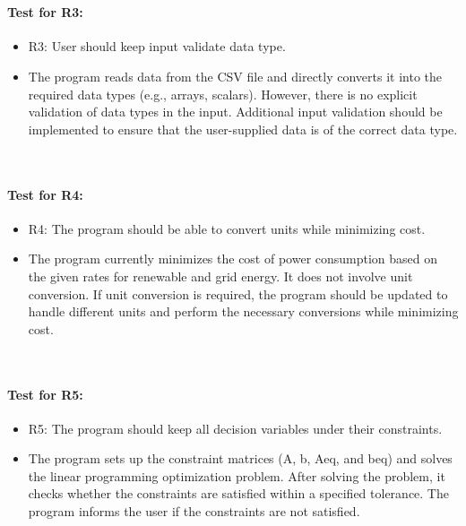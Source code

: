\documentclass[12pt, titlepage]{article}
\begin{document}
\\
\paragraph{Test for R3:}

\begin{itemize}
    \item R3: User should keep input validate data type.
    \item The program reads data from the CSV file and directly converts it into the required data types (e.g., arrays, scalars). However, there is no explicit validation of data types in the input. Additional input validation should be implemented to ensure that the user-supplied data is of the correct data type.
\end{itemize}	

\\
\paragraph{Test for R4:}

\begin{itemize}
    \item R4: The program should be able to convert units while minimizing cost.
    \item The program currently minimizes the cost of power consumption based on the given rates for renewable and grid energy. It does not involve unit conversion. If unit conversion is required, the program should be updated to handle different units and perform the necessary conversions while minimizing cost.
\end{itemize}	

\\
\paragraph{Test for R5:}

\begin{itemize}
    \item R5: The program should keep all decision variables under their constraints.
    \item The program sets up the constraint matrices (A, b, Aeq, and beq) and solves the linear programming optimization problem. After solving the problem, it checks whether the constraints are satisfied within a specified tolerance. The program informs the user if the constraints are not satisfied.
\end{itemize}	
\end{document}
